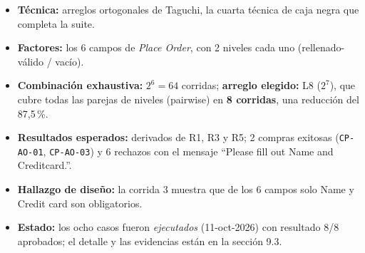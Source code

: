 \begin{itemize}
  \item \textbf{Técnica:} arreglos ortogonales de Taguchi, la cuarta técnica de caja
        negra que completa la suite.
  \item \textbf{Factores:} los 6 campos de \emph{Place Order}, con 2 niveles cada uno
        (rellenado-válido / vacío).
  \item \textbf{Combinación exhaustiva:} $2^{6}=64$ corridas; \textbf{arreglo elegido:}
        L8 ($2^{7}$), que cubre todas las parejas de niveles (pairwise) en \textbf{8
        corridas}, una reducción del 87,5\,\%.
  \item \textbf{Resultados esperados:} derivados de R1, R3 y R5; 2 compras exitosas
        (\texttt{CP-AO-01}, \texttt{CP-AO-03}) y 6 rechazos con el mensaje ``Please fill
        out Name and Creditcard.''.
  \item \textbf{Hallazgo de diseño:} la corrida 3 muestra que de los 6 campos solo Name
        y Credit card son obligatorios.
  \item \textbf{Estado:} los ocho casos fueron \emph{ejecutados} (11-oct-2026) con
        resultado 8/8 aprobados; el detalle y las evidencias están en la sección 9.3.
\end{itemize}
